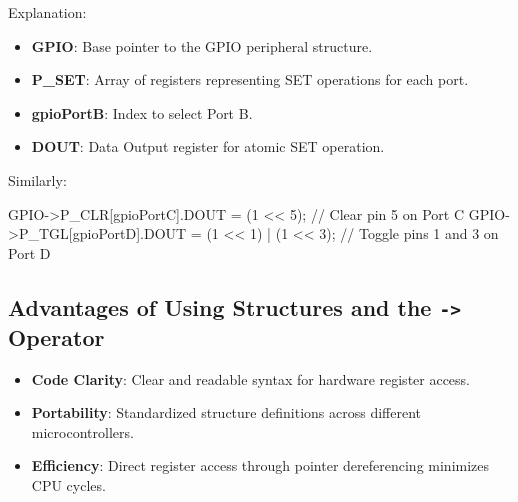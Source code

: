 \documentclass[
  9pt,
  letterpaper,
  abstract,
  titlepage]{scrbook}
\newenvironment{Shaded}{\begin{snugshade}}{\end{snugshade}}
\newcommand{\CommentTok}[1]{\textcolor[rgb]{0.37,0.37,0.37}{#1}}
\newcommand{\DecValTok}[1]{\textcolor[rgb]{0.68,0.00,0.00}{#1}}
\newcommand{\NormalTok}[1]{\textcolor[rgb]{0.00,0.23,0.31}{#1}}
\newcommand{\OperatorTok}[1]{\textcolor[rgb]{0.37,0.37,0.37}{#1}}
\begin{document}
Explanation:

\begin{itemize}
\item
  \textbf{GPIO}: Base pointer to the GPIO peripheral structure.
\item
  \textbf{P\_SET}: Array of registers representing SET operations for
  each port.
\item
  \textbf{gpioPortB}: Index to select Port B.
\item
  \textbf{DOUT}: Data Output register for atomic SET operation.
\end{itemize}

Similarly:

\begin{Shaded}
\begin{Highlighting}[]
\NormalTok{GPIO}\OperatorTok{{-}\textgreater{}}\NormalTok{P\_CLR}\OperatorTok{[}\NormalTok{gpioPortC}\OperatorTok{].}\NormalTok{DOUT }\OperatorTok{=} \OperatorTok{(}\DecValTok{1} \OperatorTok{\textless{}\textless{}} \DecValTok{5}\OperatorTok{);} \CommentTok{// Clear pin 5 on Port C}
\NormalTok{GPIO}\OperatorTok{{-}\textgreater{}}\NormalTok{P\_TGL}\OperatorTok{[}\NormalTok{gpioPortD}\OperatorTok{].}\NormalTok{DOUT }\OperatorTok{=} \OperatorTok{(}\DecValTok{1} \OperatorTok{\textless{}\textless{}} \DecValTok{1}\OperatorTok{)} \OperatorTok{|} \OperatorTok{(}\DecValTok{1} \OperatorTok{\textless{}\textless{}} \DecValTok{3}\OperatorTok{);} \CommentTok{// Toggle pins 1 and 3 on Port D}
\end{Highlighting}
\end{Shaded}

\subsection{\texorpdfstring{Advantages of Using Structures and the
\texttt{-\textgreater{}}
Operator}{Advantages of Using Structures and the -\textgreater{} Operator}}\label{advantages-of-using-structures-and-the---operator}

\begin{itemize}
\item
  \textbf{Code Clarity}: Clear and readable syntax for hardware register
  access.
\item
  \textbf{Portability}: Standardized structure definitions across
  different microcontrollers.
\item
  \textbf{Efficiency}: Direct register access through pointer
  dereferencing minimizes CPU cycles.
\end{itemize}
\end{document}
